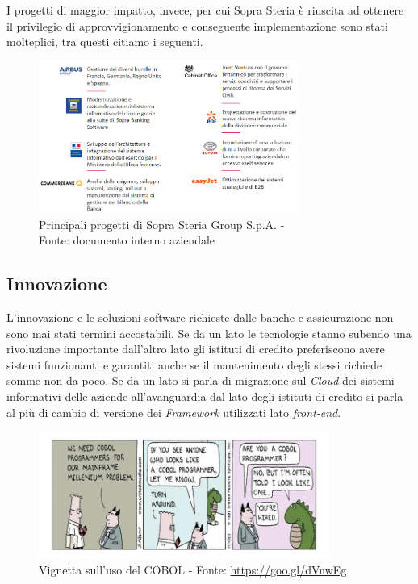 	I progetti di maggior impatto, invece, per cui Sopra Steria è riuscita ad ottenere il privilegio di approvvigionamento e conseguente implementazione sono stati molteplici, tra questi citiamo i seguenti.
	\begin{figure}[H]
	\centering
   	\includegraphics[width=0.76\textwidth]{immagini/Progetti_Importanti}
   	\caption{Principali progetti di Sopra Steria Group S.p.A. - \\Fonte: documento interno aziendale}
	\end{figure}

	
	\subsection{Innovazione}
	
	L'innovazione e le soluzioni software richieste dalle banche e assicurazione non sono mai stati termini accostabili. %
	Se da un lato le tecnologie stanno subendo una rivoluzione importante dall'altro lato gli istituti di credito preferiscono avere sistemi funzionanti e garantiti anche se il mantenimento degli stessi richiede somme non da poco. Se da un lato si parla di migrazione sul  \textit{Cloud} dei sistemi informativi delle aziende all'avanguardia dal lato degli istituti di credito si parla al più di cambio di versione dei  \textit{Framework} utilizzati lato  \textit{front-end}\glossario.\\

	\begin{figure}[H]
	\centering
	\includegraphics[width=0.85\textwidth]{immagini/VignettaCobol}
	\caption{Vignetta sull'uso del COBOL - Fonte: \url{https://goo.gl/dVnwEg}}
	\end{figure}
	
